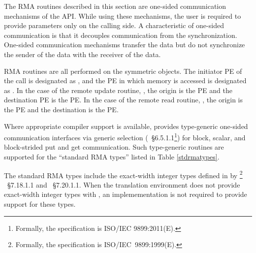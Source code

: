 The \ac{RMA} routines described in this section are one-sided communication
mechanisms of the \openshmem \ac{API}. While using these mechanisms, the user
is required to provide parameters only on the calling side. A characteristic of
one-sided communication is that it decouples communication from the
synchronization. One-sided communication mechanisms transfer the data but do not
synchronize the sender of the data with the receiver of the data. 

\openshmem \ac{RMA} routines 
 are all performed on the symmetric objects.  The initiator \ac{PE} of the call is designated 
 as \source{}, and the \ac{PE} in which memory is accessed is designated as \dest{}. 
 In the case of the remote update routine, \PUT{},  the origin is the \source{} \ac{PE} 
 and the destination \ac{PE} is the \dest{} PE. In the case of the remote read routine, \GET{}, the
 origin is the \dest{} \ac{PE} and the destination is the \source{} \ac{PE}.

Where appropriate compiler support is available, \openshmem provides type-generic 
one-sided communication interfaces via \Cstd[11] generic selection
(\Cstd[11]~\S6.5.1.1\footnote{Formally, the \Cstd[11] specification is ISO/IEC 9899:2011(E).})
for block, scalar, and block-strided put and get communication. 
Such type-generic routines are supported for the ``standard \ac{RMA} types''
listed in Table \ref{stdrmatypes}.

The standard \ac{RMA} types include the exact-width integer types defined in
 by \Cstd[99]%
\footnote{Formally, the \Cstd[99] specification is ISO/IEC~9899:1999(E).}%
~\S7.18.1.1 and \Cstd[11]~\S7.20.1.1. When the \Cstd translation environment
does not provide exact-width integer types with , an
\openshmem implemementation is not required to provide support for these types.

